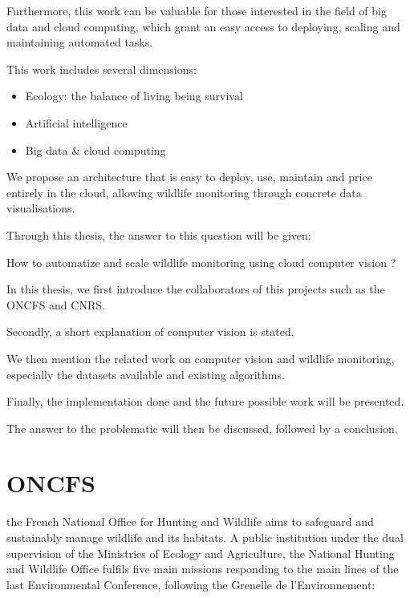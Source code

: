 Furthermore, this work can be valuable for those interested in the field of big data and cloud computing, which grant an easy access to deploying, scaling and maintaining automated tasks.

This work includes several dimensions: 
\begin{itemize}
    \item Ecology: the balance of living being survival
    \item Artificial intelligence
    \item Big data \& cloud computing
\end{itemize}

We propose an architecture that is easy to deploy, use, maintain and price entirely in the cloud, allowing wildlife monitoring through concrete data visualisations.

Through this thesis, the answer to this question will be given:

\begin{it}  
How to automatize and scale wildlife monitoring using cloud computer vision ?
\end{it}


In this thesis, we first introduce the collaborators of this projects such as the ONCFS and CNRS.

Secondly, a short explanation of computer vision is stated.

We then mention the related work on computer vision and wildlife monitoring, especially the datasets available and existing algorithms.

Finally, the implementation done and the future possible work will be presented.

The answer to the problematic will then be discussed, followed by a conclusion.




\pagebreak\section{ONCFS}
the French National Office for Hunting and Wildlife aims to safeguard and sustainably manage wildlife and its habitats.
A public institution under the dual supervision of the Ministries of Ecology and Agriculture, the National Hunting and Wildlife Office fulfils five main missions responding to the main lines of the last Environmental Conference, following the Grenelle de l'Environnement:


